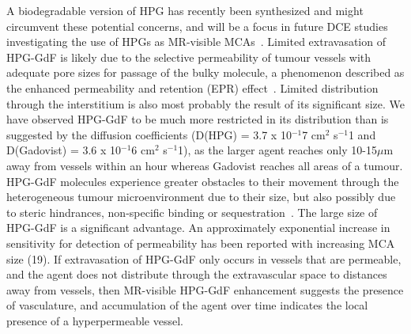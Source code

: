 A biodegradable version of HPG has recently been synthesized and might circumvent these potential concerns, and will be a focus in future DCE studies investigating the use of HPGs as MR-visible MCAs~\cite{Shenoi:2013id}.
Limited extravasation of HPG-GdF is likely due to the selective permeability of tumour vessels with adequate pore sizes for passage of the bulky molecule, a phenomenon described as the enhanced permeability and retention (EPR) effect~\cite{Maeda:2013hq}.
Limited distribution through the interstitium is also most probably the result of its significant size.
We have observed HPG-GdF to be much more restricted in its distribution than is suggested by the diffusion coefficients (D(HPG) = 3.7 x 10$^{-1}$7 cm$^2$ s$^{-1}$1 and D(Gadovist) = 3.6 x 10$^{-1}$6 cm$^2$ s$^{-1}$1), as the larger agent reaches only 10-15$\mu$m away from vessels within an hour whereas Gadovist reaches all areas of a tumour.
HPG-GdF molecules experience greater obstacles to their movement through the heterogeneous tumour microenvironment due to their size, but also possibly due to steric hindrances, non-specific binding or sequestration~\cite{Minchinton:2006gs}.
The large size of HPG-GdF is a significant advantage.
An approximately exponential increase in sensitivity for detection of permeability has been reported with increasing MCA size (19).
If extravasation of HPG-GdF only occurs in vessels that are permeable, and the agent does not distribute through the extravascular space to distances away from vessels, then MR-visible HPG-GdF enhancement suggests the presence of vasculature, and accumulation of the agent over time indicates the local presence of a hyperpermeable vessel.


